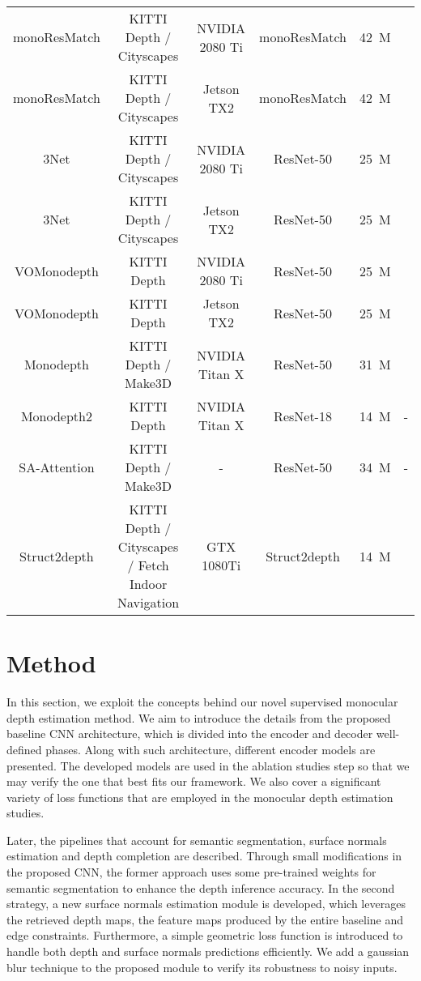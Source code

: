 \documentclass[5p]{elsarticle}
\begin{document}
\begin{table*}[htb!]
{\begin{tabular}{c|c|c|c|c|c}
monoResMatch \cite{tosi2019learning} & KITTI Depth / Cityscapes & NVIDIA 2080 Ti & monoResMatch & 42\ M & \\
monoResMatch \cite{tosi2019learning} & KITTI Depth / Cityscapes & Jetson TX2 & monoResMatch & 42\ M & \\
3Net \cite{poggi2018learning} & KITTI Depth / Cityscapes & NVIDIA 2080 Ti & ResNet-50 & 25\ M & \\
3Net \cite{poggi2018learning} & KITTI Depth / Cityscapes & Jetson TX2 & ResNet-50 & 25\ M & \\
VOMonodepth \cite{andraghetti2019enhancing} & KITTI Depth & NVIDIA 2080 Ti & ResNet-50 & 25\ M & \\
VOMonodepth \cite{andraghetti2019enhancing} & KITTI Depth & Jetson TX2 & ResNet-50 & 25\ M & \\
Monodepth \cite{godard2017unsupervised} & KITTI Depth / Make3D & NVIDIA Titan X & ResNet-50 & 31\ M &\\
Monodepth2 \cite{godard2019digging} & KITTI Depth & NVIDIA Titan X & ResNet-18 & 14\ M & -\\
SA-Attention \cite{zhou2019unsupervised} & KITTI Depth / Make3D & - & ResNet-50 & 34\ M & -\\
Struct2depth \cite{casser2019depth} & KITTI Depth / Cityscapes / Fetch Indoor Navigation & GTX 1080Ti & Struct2depth & 14\ M & \\
\hline
\end{tabular}
} 
\end{table*} 


\section{Method}
\label{metodologia}

In this section, we exploit the concepts behind our novel supervised monocular depth estimation method. We aim to introduce the details from the proposed baseline CNN architecture, which is divided into the encoder and decoder well-defined phases. Along with such architecture,  different encoder models are presented. The developed models are used in the ablation studies step so that we may verify the one that best fits our framework. We also cover a significant variety of loss functions that are employed in the monocular depth estimation studies. 

Later, the pipelines that account for semantic segmentation, surface normals estimation and depth completion are described. Through small modifications in the proposed CNN, the former approach uses some pre-trained weights for semantic segmentation to enhance the depth inference accuracy. In the second strategy, a new surface normals estimation module is developed, which leverages the retrieved depth maps, the feature maps produced by the entire baseline and edge constraints. Furthermore, a simple geometric loss function is introduced to handle both depth and surface normals predictions efficiently. We add a gaussian blur technique to the proposed module to verify its robustness to noisy inputs.
\end{document}
